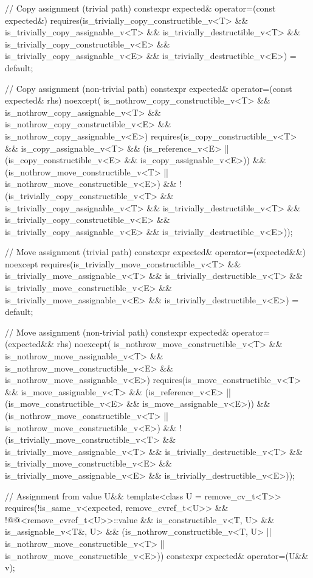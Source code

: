 \begin{codeblock}
{  // Copy assignment (trivial path)
  constexpr expected& operator=(const expected&)
    requires(is_trivially_copy_constructible_v<T> &&
             is_trivially_copy_assignable_v<T> && is_trivially_destructible_v<T> &&
             is_trivially_copy_constructible_v<E> &&
             is_trivially_copy_assignable_v<E> && is_trivially_destructible_v<E>)
  = default;

  // Copy assignment (non-trivial path)
  constexpr expected& operator=(const expected& rhs) noexcept(
      is_nothrow_copy_constructible_v<T> && is_nothrow_copy_assignable_v<T> &&
      is_nothrow_copy_constructible_v<E> && is_nothrow_copy_assignable_v<E>)
    requires(is_copy_constructible_v<T> && is_copy_assignable_v<T> &&
             (is_reference_v<E> ||
              (is_copy_constructible_v<E> && is_copy_assignable_v<E>)) &&
             (is_nothrow_move_constructible_v<T> ||
              is_nothrow_move_constructible_v<E>) &&
             !(is_trivially_copy_constructible_v<T> &&
               is_trivially_copy_assignable_v<T> && is_trivially_destructible_v<T> &&
               is_trivially_copy_constructible_v<E> &&
               is_trivially_copy_assignable_v<E> && is_trivially_destructible_v<E>));

  // Move assignment (trivial path)
  constexpr expected& operator=(expected&&) noexcept
    requires(is_trivially_move_constructible_v<T> &&
             is_trivially_move_assignable_v<T> && is_trivially_destructible_v<T> &&
             is_trivially_move_constructible_v<E> &&
             is_trivially_move_assignable_v<E> && is_trivially_destructible_v<E>)
  = default;

  // Move assignment (non-trivial path)
  constexpr expected& operator=(expected&& rhs) noexcept(
      is_nothrow_move_constructible_v<T> && is_nothrow_move_assignable_v<T> &&
      is_nothrow_move_constructible_v<E> && is_nothrow_move_assignable_v<E>)
    requires(is_move_constructible_v<T> && is_move_assignable_v<T> &&
             (is_reference_v<E> ||
              (is_move_constructible_v<E> && is_move_assignable_v<E>)) &&
             (is_nothrow_move_constructible_v<T> ||
              is_nothrow_move_constructible_v<E>) &&
             !(is_trivially_move_constructible_v<T> &&
               is_trivially_move_assignable_v<T> && is_trivially_destructible_v<T> &&
               is_trivially_move_constructible_v<E> &&
               is_trivially_move_assignable_v<E> && is_trivially_destructible_v<E>));

  // Assignment from value U&&
  template<class U = remove_cv_t<T>>
    requires(!is_same_v<expected, remove_cvref_t<U>> &&
             !@@<remove_cvref_t<U>>::value &&
             is_constructible_v<T, U> && is_assignable_v<T&, U> &&
             (is_nothrow_constructible_v<T, U> || is_nothrow_move_constructible_v<T> ||
              is_nothrow_move_constructible_v<E>))
  constexpr expected& operator=(U&& v);

}
\end{codeblock}
